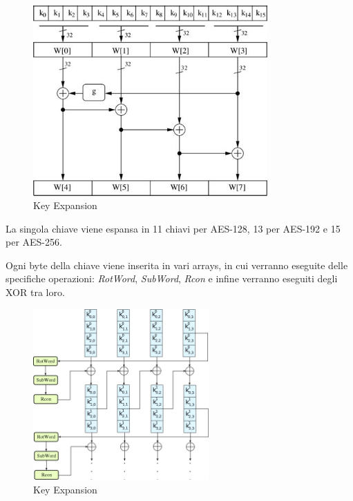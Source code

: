 \begin{figure}[H]
	\centering
	\includegraphics[width=0.8\textwidth, height=0.8\textheight, keepaspectratio]{./images/key_expansion/key_expansion.png}
	\caption{Key Expansion}
	\label{fig:key_expansion}
\end{figure}


\textsf{\small La singola chiave viene espansa in 11 chiavi per AES-128, 13 per AES-192 e 15 per AES-256.}

   

\textsf{\small Ogni byte della chiave viene inserita in vari arrays, in cui verranno eseguite delle specifiche operazioni: \emph{RotWord}, \emph{SubWord}, \emph{Rcon} e infine verranno eseguiti degli XOR tra loro.}

\begin{figure}[H]
	\centering
	\includegraphics[width=0.6\textwidth, height=0.6\textheight, keepaspectratio]{./images/key_expansion/AES-Key_Schedule_128-bit_key.png}
	\caption{Key Expansion}
	\label{fig:key_expansion2}
\end{figure}

